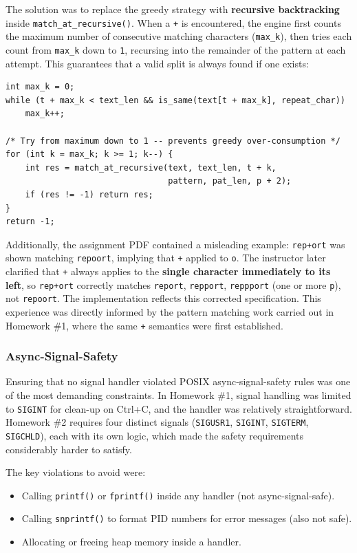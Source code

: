 \documentclass[12pt,a4paper]{article}
\begin{document}
The solution was to replace the greedy strategy with \textbf{recursive
backtracking} inside \texttt{match\_at\_recursive()}. When a \texttt{+} is
encountered, the engine first counts the maximum number of consecutive
matching characters (\texttt{max\_k}), then tries each count from
\texttt{max\_k} down to \texttt{1}, recursing into the remainder of the
pattern at each attempt. This guarantees that a valid split is always found
if one exists:

\begin{lstlisting}[caption={Backtracking loop in pattern\_matching.c}]
int max_k = 0;
while (t + max_k < text_len && is_same(text[t + max_k], repeat_char))
    max_k++;

/* Try from maximum down to 1 -- prevents greedy over-consumption */
for (int k = max_k; k >= 1; k--) {
    int res = match_at_recursive(text, text_len, t + k,
                                 pattern, pat_len, p + 2);
    if (res != -1) return res;
}
return -1;
\end{lstlisting}

Additionally, the assignment PDF contained a misleading example: \texttt{rep+ort}
was shown matching \texttt{repoort}, implying that \texttt{+} applied to
\texttt{o}. The instructor later clarified that \texttt{+} always applies to
the \textbf{single character immediately to its left}, so \texttt{rep+ort}
correctly matches \texttt{report}, \texttt{repport}, \texttt{reppport} (one
or more \texttt{p}), not \texttt{repoort}. The implementation reflects this
corrected specification. This experience was directly informed by the pattern
matching work carried out in Homework \#1, where the same \texttt{+} semantics
were first established.

\subsubsection{Async-Signal-Safety}

Ensuring that no signal handler violated POSIX async-signal-safety rules was
one of the most demanding constraints. In Homework \#1, signal handling was
limited to \texttt{SIGINT} for clean-up on Ctrl+C, and the handler was
relatively straightforward. Homework \#2 requires four distinct signals
(\texttt{SIGUSR1}, \texttt{SIGINT}, \texttt{SIGTERM}, \texttt{SIGCHLD}),
each with its own logic, which made the safety requirements considerably harder
to satisfy.

The key violations to avoid were:
\begin{itemize}
    \item Calling \texttt{printf()} or \texttt{fprintf()} inside any handler
          (not async-signal-safe).
    \item Calling \texttt{snprintf()} to format PID numbers for error messages
          (also not safe).
    \item Allocating or freeing heap memory inside a handler.
\end{itemize}
\end{document}
